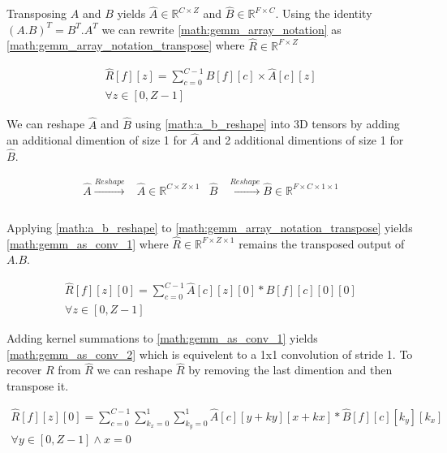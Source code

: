 Transposing $A$ and $B$ yields $\hat{A} \in \mathbb{R}^{C\times Z}$ and $\hat{B} \in
\mathbb{R}^{F\times C}$. Using the identity $(A.B)^T = B^T.A^T$ we can rewrite
\autoref{math:gemm_array_notation} as
\autoref{math:gemm_array_notation_transpose} where $\hat{R} \in
\mathbb{R}^{F\times Z}$

\begin{equation}
    \begin{aligned}
        \hat{R}[f][z] = \displaystyle\sum\limits_{c=0}^{C-1}\hat{B}[f][c]\times \hat{A}[c][z] \\ \forall z\in[0, Z-1]
    \end{aligned}
    \label{math:gemm_array_notation_transpose}
\end{equation}

We can reshape $\hat{A}$ and $\hat{B}$ using \autoref{math:a_b_reshape} into 3D
tensors by adding an additional dimention of size 1 for $\hat{A}$ and 2
additional dimentions of size 1 for $\hat{B}$.

\begin{equation}
    \begin{aligned}
        \hat{A} \xrightarrow[]{Reshape} &\hat{A}  \in \mathbb{R}^{C \times Z\times 1}   &\hat{B} & \xrightarrow[]{Reshape} \hat{B}  \in \mathbb{R}^{F \times C\times 1\times 1} \\
    \end{aligned}
    \label{math:a_b_reshape}
\end{equation}

Applying \autoref{math:a_b_reshape} to
\autoref{math:gemm_array_notation_transpose} yields
\autoref{math:gemm_as_conv_1} where $\hat{R} \in \mathbb{R}^{F \times Z\times 1}
$ remains the transposed output of $A.B$. 

\begin{equation}
    \begin{aligned}
        \hat{R}[f][z][0] = \displaystyle\sum\limits_{c=0}^{C-1}\hat{A}[c][z][0]*\hat{B}[f][c][0][0] \\ \forall z \in [0, Z-1] 
        \end{aligned}
    \label{math:gemm_as_conv_1}
\end{equation}

Adding kernel summations to \autoref{math:gemm_as_conv_1} yields
\autoref{math:gemm_as_conv_2} which is equivelent to a 1x1 convolution of stride
1. To recover $R$ from $\hat{R}$ we can reshape $\hat{R}$ by removing the
last dimention and then transpose it. 

\begin{equation}
    \begin{aligned}
        \hat{R}[f][z][0] = \displaystyle\sum\limits_{c=0}^{C-1}\displaystyle\sum\limits_{k_x=0}^{1} \displaystyle\sum\limits_{k_y=0}^{1}\hat{A}[c][y+ky][x+kx]*\hat{B}[f][c][k_y][k_x] \\ \forall y \in [0, Z-1] \land x = 0
    \end{aligned}
    \label{math:gemm_as_conv_2}
\end{equation}

